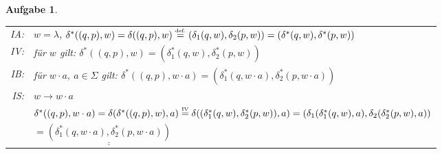 \documentclass[11pt]{article}
\theoremstyle{break}
\newtheorem{task}{Aufgabe}
\begin{document}
\begin{task}
\hfill\vspace{-2mm}\\
\begin{tabular}{rl}
IA:&$w = \lambda$, $\delta^*((q,p),w) = \delta((q,p),w) \stackrel{\mbox{\tiny def.}}{=} (\delta_1(q,w), \delta_2(p,w)) = (\delta^*(q,w), \delta^*(p,w))$\\
IV:&für $w$ gilt: $\delta^*((q,p),w) = (\delta_1^*(q,w), \delta_2^*(p,w))$\\
IB:&für $w\cdot a,\ a\in\Sigma$ gilt: $\delta^*((q,p),w\cdot a) = (\delta_1^*(q,w\cdot a), \delta_2^*(p,w\cdot a))$\\
IS:&$w\rightarrow w\cdot a$\\
&$\delta^*((q,p),w\cdot a)=\delta(\delta^*((q,p),w), a)\stackrel{\mbox{\tiny IV}}{=} \delta((\delta_1^*(q,w), \delta_2^*(p,w)), a) = (\delta_1(\delta_1^*(q,w), a), \delta_2(\delta_2^*(p,w), a))$\\
&$=\underline{\underline{(\delta_1^*(q,w\cdot a), \delta_2^*(p,w\cdot a))}}$
\end{tabular}\vspace{3mm}
\end{task}
\end{document}
